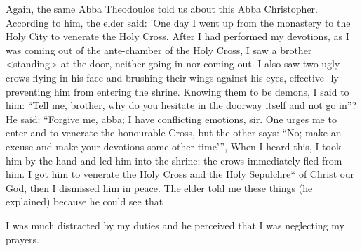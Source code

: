 Again, the same Abba Theodoulos told us about this Abba
Christopher.
According to him, the elder said: 'One day I went up
from the monastery to the Holy City to venerate the Holy Cross.
After I had performed my devotions, as I was coming out of the
ante-chamber of the Holy Cross, I saw a brother <standing> at the
door, neither going in nor coming out.
I also saw two ugly crows
flying in his face and brushing their wings against his eyes, effective-
ly preventing him from entering the shrine.
Knowing them to be
demons, I said to him: “Tell me, brother, why do you hesitate in the
doorway itself and not go in”? He said: “Forgive me, abba; I have
conflicting emotions, sir.
One urges me to enter and to venerate the
honourable Cross, but the other says: “No; make an excuse and
make your devotions some other time'”, When I heard this, I took
him by the hand and led him into the shrine; the crows immediately
fled from him.
I got him to venerate the Holy Cross and the Holy
Sepulchre* of Christ our God, then I dismissed him in peace.
The
elder told me these things (he explained) because he could see that

I was much distracted by my duties and he perceived that I was
neglecting my prayers.

